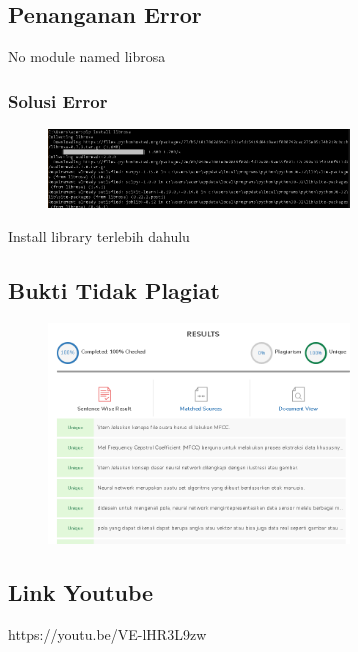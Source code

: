 \subsection{Penanganan Error}
No module named librosa
\subsubsection{Solusi Error}
\begin{figure}[H]
		\includegraphics[width=8cm]{figures/1174071/6/error.PNG}
		\centering
	\end{figure}
Install library terlebih dahulu
\subsection{Bukti Tidak Plagiat}
\begin{figure}[H]
	\includegraphics[width=8cm]{figures/1174071/6/plagiat.PNG}
	\centering
\end{figure}
\subsection{Link Youtube}
https://youtu.be/VE-lHR3L9zw